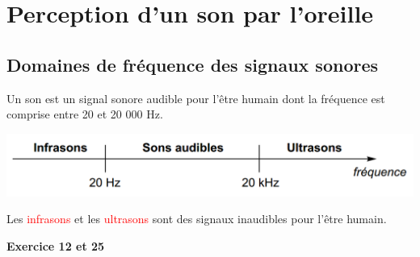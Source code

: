 \section{Perception d'un son par l'oreille}
\subsection{Domaines de fréquence des signaux sonores}
\begin{tcolorbox}[colback=red!5!white,colframe=red!75!black,title=\textbf{Fréquences des signaux sonores : }]
Un son est un signal sonore audible pour l'être humain dont la fréquence est comprise entre 20 et 20 000 Hz.
\begin{center}
    \includegraphics[scale=0.7]{Images/domaine_freq.PNG}
\end{center}
Les \textcolor{red}{infrasons} et les \textcolor{red}{ultrasons} sont des signaux inaudibles pour l'être humain.
\end{tcolorbox}
\begin{Large}
\end{Large}\textbf{Exercice 12 et 25}



